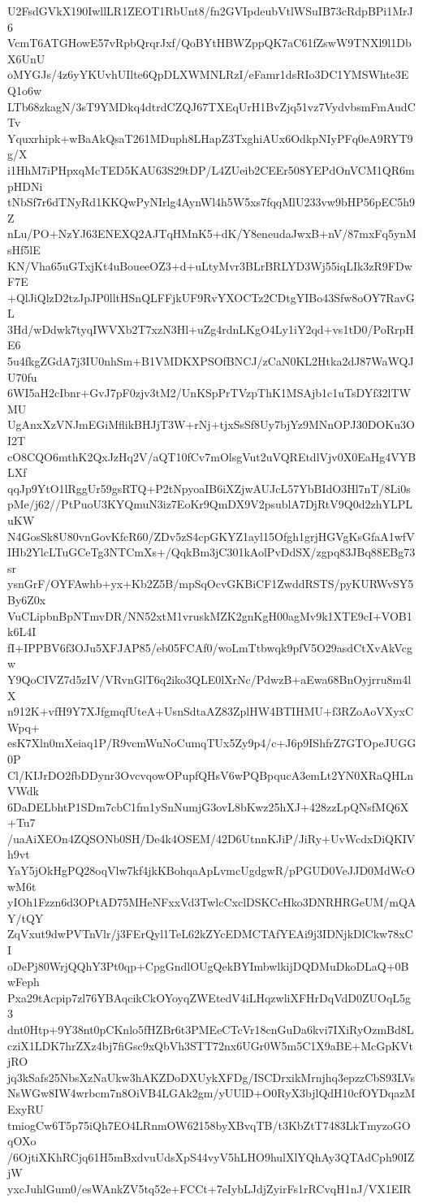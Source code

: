 U2FsdGVkX190IwllLR1ZEOT1RbUnt8/fn2GVIpdeubVtlWSuIB73cRdpBPi1MrJ6
VcmT6ATGHowE57vRpbQrqrJxf/QoBYtHBWZppQK7aC61fZswW9TNXl9l1DbX6UnU
oMYGJs/4z6yYKUvhUIlte6QpDLXWMNLRzI/eFamr1dsRIo3DC1YMSWhte3EQ1o6w
LTb68zkagN/3sT9YMDkq4dtrdCZQJ67TXEqUrH1BvZjq51vz7VydvbsmFmAudCTv
Yquxrhipk+wBaAkQsaT261MDuph8LHapZ3TxghiAUx6OdkpNIyPFq0eA9RYT9g/X
i1HhM7iPHpxqMcTED5KAU63S29tDP/L4ZUeib2CEEr508YEPdOnVCM1QR6mpHDNi
tNbSf7r6dTNyRd1KKQwPyNIrlg4AynWl4h5W5xs7fqqMlU233vw9bHP56pEC5h9Z
nLu/PO+NzYJ63ENEXQ2AJTqHMnK5+dK/Y8eneudaJwxB+nV/87mxFq5ynMsHf5lE
KN/Vha65uGTxjKt4uBoueeOZ3+d+uLtyMvr3BLrBRLYD3Wj55iqLIk3zR9FDwF7E
+QlJiQlzD2tzJpJP0lltHSnQLFFjkUF9RvYXOCTz2CDtgYIBo43Sfw8oOY7RavGL
3Hd/wDdwk7tyqIWVXb2T7xzN3Hl+uZg4rdnLKgO4Ly1iY2qd+vs1tD0/PoRrpHE6
5u4fkgZGdA7j3IU0nhSm+B1VMDKXPSOfBNCJ/zCaN0KL2Htka2dJ87WaWQJU70fu
6WI5aH2cIbnr+GvJ7pF0zjv3tM2/UnKSpPrTVzpThK1MSAjb1c1uTsDYf32lTWMU
UgAnxXzVNJmEGiMflikBHJjT3W+rNj+tjxSsSf8Uy7bjYz9MNnOPJ30DOKu3OI2T
cO8CQO6mthK2QxJzHq2V/aQT10fCv7mOlsgVut2uVQREtdlVjv0X0EaHg4VYBLXf
qqJp9YtO1lRggUr59gsRTQ+P2tNpyoaIB6iXZjwAUJcL57YbBIdO3Hl7nT/8Li0s
pMe/j62//PtPuoU3KYQmuN3iz7EoKr9QmDX9V2psublA7DjRtV9Q0d2zhYLPLuKW
N4GosSk8U80vnGovKfcR60/ZDv5zS4cpGKYZ1ayl15Ofgh1grjHGVgKsGfaA1wfV
IHb2YlcLTuGCeTg3NTCmXs+/QqkBm3jC301kAolPvDdSX/zgpq83JBq88EBg73sr
ysnGrF/OYFAwhb+yx+Kb2Z5B/mpSqOcvGKBiCF1ZwddRSTS/pyKURWvSY5By6Z0x
VuCLipbnBpNTmvDR/NN52xtM1vruskMZK2gnKgH00agMv9k1XTE9cI+VOB1k6L4I
fI+IPPBV6f3OJu5XFJAP85/eb05FCAf0/woLmTtbwqk9pfV5O29asdCtXvAkVcgw
Y9QoCIVZ7d5zIV/VRvnGlT6q2iko3QLE0lXrNc/PdwzB+aEwa68BnOyjrru8m4lX
n912K+vfH9Y7XJfgmqfUteA+UsnSdtaAZ83ZplHW4BTIHMU+f3RZoAoVXyxCWpq+
esK7Xln0mXeiaq1P/R9vcmWuNoCumqTUx5Zy9p4/c+J6p9IShfrZ7GTOpeJUGG0P
Cl/KIJrDO2fbDDynr3OvcvqowOPupfQHsV6wPQBpqucA3emLt2YN0XRaQHLnVWdk
6DaDELbhtP1SDm7cbC1fm1ySnNumjG3ovL8bKwz25hXJ+428zzLpQNsfMQ6X+Tu7
/uaAiXEOn4ZQSONb0SH/De4k4OSEM/42D6UtnnKJiP/JiRy+UvWcdxDiQKIVh9vt
YaY5jOkHgPQ28oqVlw7kf4jkKBohqaApLvmcUgdgwR/pPGUD0VeJJD0MdWcOwM6t
yIOh1Fzzn6d3OPtAD75MHeNFxxVd3TwlcCxclDSKCcHko3DNRHRGeUM/mQAY/tQY
ZqVxut9dwPVTnVlr/j3FErQyl1TeL62kZYcEDMCTAfYEAi9j3IDNjkDlCkw78xCI
oDePj80WrjQQhY3Pt0qp+CpgGndlOUgQekBYImbwlkijDQDMuDkoDLaQ+0BwFeph
Pxa29tAcpip7zl76YBAqcikCkOYoyqZWEtedV4iLHqzwliXFHrDqVdD0ZUOqL5g3
dnt0Htp+9Y38nt0pCKnlo5fHZBr6t3PMEeCTcVr18cnGuDa6kvi7IXiRyOzmBd8L
cziX1LDK7hrZXz4bj7fiGsc9xQbVh3STT72nx6UGr0W5m5C1X9aBE+McGpKVtjRO
jq3kSafs25NbsXzNaUkw3hAKZDoDXUykXFDg/ISCDrxikMrnjhq3epzzCbS93LVs
NsWGw8IW4wrbcm7n8OiVB4LGAk2gm/yUUlD+O0RyX3bjlQdH10cfOYDqazMExyRU
tmiogCw6T5p75iQh7EO4LRnmOW62158byXBvqTB/t3KbZtT7483LkTmyzoGOqOXo
/6OjtiXKhRCjq61H5mBxdvuUdsXpS44vyV5hLHO9hulXlYQhAy3QTAdCph90IZjW
yxcJuhlGum0/esWAnkZV5tq52e+FCCt+7eIybLJdjZyirFs1rRCvqH1nJ/VX1EIR

